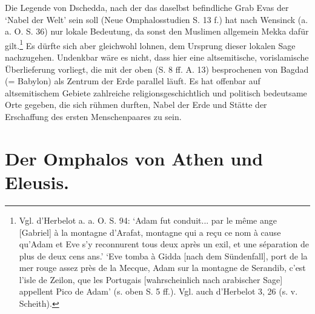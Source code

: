 \documentclass[a4paper, 11pt, oneside]{article}
\begin{document}
Die Legende von Dschedda, nach der das daselbst befindliche Grab Evas der `Nabel der Welt' sein soll (Neue Omphalosstudien S. 13 f.) hat nach Wensinck (a. a. O. S. 36) nur lokale Bedeutung, da sonst den Muslimen allgemein Mekka dafür gilt.\footnote{Vgl. d'Herbelot a. a. O. S. 94: `Adam fut conduit... par le même ange [Gabriel] à la montagne d'Arafat, montagne qui a reçu ce nom à cause qu'Adam et Eve s'y reconnurent tous deux après un exil, et une séparation de plus de deux cens ans.' `Eve tomba à Gidda [nach dem Sündenfall], port de la mer rouge assez près de la Mecque, Adam sur la montagne de Serandib, c'est l'isle de Zeilon, que les Portugais [wahrscheinlich nach arabischer Sage] appellent Pico de Adam' (s. oben S. 5 ff.). Vgl. auch d'Herbelot 3, 26 (s. v. Scheith).} Es dürfte sich aber gleichwohl lohnen, dem Ursprung dieser lokalen Sage nachzugehen. Undenkbar wäre es nicht, dass hier eine altsemitische, vorislamische Überlieferung vorliegt, die mit der oben (S. 8 ff. A. 13) besprochenen von Bagdad (= Babylon) als Zentrum der Erde parallel läuft. Es hat offenbar auf altsemitischem Gebiete zahlreiche religionsgeschichtlich und politisch bedeutsame Orte gegeben, die sich rühmen durften, Nabel der Erde und Stätte der Erschaffung des ersten Menschenpaares zu sein.
\clearpage
\section{Der Omphalos von Athen und Eleusis.}
\end{document}
